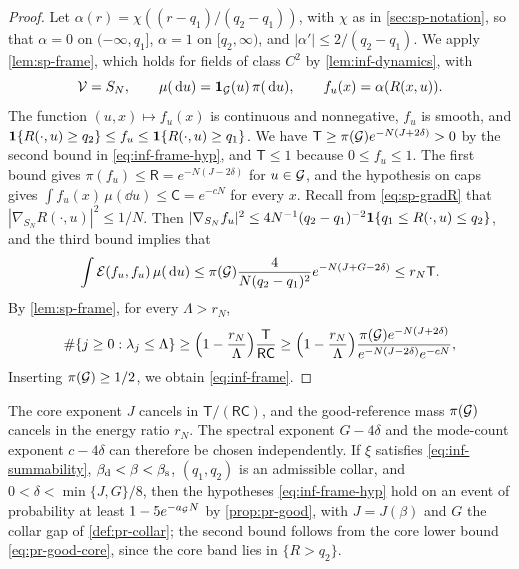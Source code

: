 \begin{proof}
Let $\alpha(r)=\chi((r-q_1)/(q_2-q_1))$, with $\chi$ as in \cref{sec:sp-notation}, so that $\alpha=0$ on $(-\infty,q_1]$, $\alpha=1$ on $[q_2,\infty)$, and $|\alpha'|\le2/(q_2-q_1)$. We apply \cref{lem:sp-frame}, which holds for fields of class $C^2$ by \cref{lem:inf-dynamics}, with
\begin{equation*}
\mathcal V=S_N,\qquad\mu(\,\mathrm d u)=\mathbf 1_\mathcal G(u)\,\pi(\,\mathrm d u),\qquad f_u(x)=\alpha(R(x,u)).
\end{equation*}
The function $(u,x)\mapsto f_u(x)$ is continuous and nonnegative, $f_u$ is smooth, and $\mathbf 1\{R(\cdot,u)\ge q_2\}\le f_u\le\mathbf 1\{R(\cdot,u)\ge q_1\}$. We have $\mathsf T\ge\pi(\mathcal G)e^{-N(J+2\delta)}>0$ by the second bound in \eqref{eq:inf-frame-hyp}, and $\mathsf T\le1$ because $0\le f_u\le1$. The first bound gives $\pi(f_u)\le\mathsf R=e^{-N(J-2\delta)}$ for $u\in\mathcal G$, and the hypothesis on caps gives $\int f_u(x)\,\mu(\dd u)\le\mathsf C=e^{-cN}$ for every $x$. Recall from \eqref{eq:sp-gradR} that $|\nabla_{S_N}R(\cdot,u)|^2\le1/N$. Then $|\nabla_{S_N}f_u|^2\le4N^{-1}(q_2-q_1)^{-2}\mathbf 1\{q_1\le R(\cdot,u)\le q_2\}$, and the third bound implies that
\begin{equation*}
\int\mathcal E(f_u,f_u)\,\mu(\,\mathrm d u)\le\pi(\mathcal G)\frac4{N(q_2-q_1)^2}e^{-N(J+G-2\delta)}\le r_N\mathsf T.
\end{equation*}
By \cref{lem:sp-frame}, for every $\Lambda>r_N$,
\begin{equation*}
\#\{j\ge0:\lambda_j\le\Lambda\}\ge\Bigl(1-\frac{r_N}\Lambda\Bigr)\frac{\mathsf T}{\mathsf R\mathsf C}\ge\Bigl(1-\frac{r_N}\Lambda\Bigr)\frac{\pi(\mathcal G)e^{-N(J+2\delta)}}{e^{-N(J-2\delta)}e^{-cN}},
\end{equation*}
Inserting $\pi(\mathcal G)\ge1/2$, we obtain \eqref{eq:inf-frame}.
\end{proof}

The core exponent $J$ cancels in $\mathsf T/(\mathsf R\mathsf C)$, and the good-reference mass $\pi(\mathcal G)$ cancels in the energy ratio $r_N$. The spectral exponent $G-4\delta$ and the mode-count exponent $c-4\delta$ can therefore be chosen independently. If $\xi$ satisfies \eqref{eq:inf-summability}, $\beta_{\mathrm d}<\beta<\beta_{\mathrm s}$, $(q_1,q_2)$ is an admissible collar, and $0<\delta<\min\{J,G\}/8$, then the hypotheses \eqref{eq:inf-frame-hyp} hold on an event of probability at least $1-5e^{-a_\mathcal G N}$ by \cref{prop:pr-good}, with $J=J(\beta)$ and $G$ the collar gap of \cref{def:pr-collar}; the second bound follows from the core lower bound \eqref{eq:pr-good-core}, since the core band lies in $\{R>q_2\}$.

